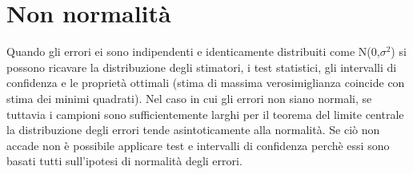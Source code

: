 \documentclass[a4page, 11pt]{article}
\begin{document}
\section{Non normalità}

Quando gli errori ei sono indipendenti e identicamente distribuiti come N(0,$\sigma^{2}$) si possono ricavare la distribuzione degli stimatori, i test statistici, gli intervalli di confidenza e le proprietà ottimali (stima di massima verosimiglianza coincide con stima dei minimi quadrati). Nel caso in cui gli errori non siano normali, se tuttavia i campioni sono sufficientemente larghi per il teorema del limite centrale la distribuzione degli errori tende asintoticamente alla normalità. Se ciò non accade non è possibile applicare test e intervalli di confidenza perchè essi sono basati tutti sull’ipotesi di normalità degli errori.
\end{document}

